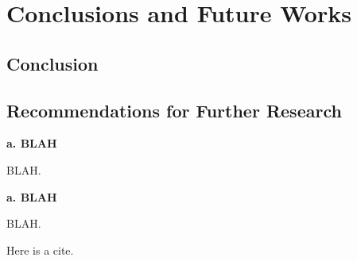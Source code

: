 \chapter[Conclusion and Future Work]{Conclusions and Future Works}
\label{chap:chap_final}


\textit{\fontsize{14pt}{\baselineskip}\selectfont{
		\lipsum[1]
	}}
\newpage

\section{Conclusion}
\lipsum[1]

\section{Recommendations for Further Research}
\lipsum[1]

\noindent\textbf{a. BLAH}

\noindent BLAH.

\lipsum[1]

\noindent\textbf{a. BLAH}

\noindent BLAH.

\lipsum[1]

Here is a cite. \cite{example}

\cleardoublepage